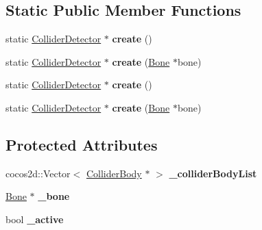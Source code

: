 \subsection*{Static Public Member Functions}
\begin{DoxyCompactItemize}
\item 
\mbox{\label{classcocostudio_1_1ColliderDetector_a4f50614bb946690fc646c7e4a01f9598}} 
static \hyperlink{classcocostudio_1_1ColliderDetector}{Collider\+Detector} $\ast$ {\bfseries create} ()
\item 
\mbox{\label{classcocostudio_1_1ColliderDetector_a4b89505c1329dca09ca7022883796aeb}} 
static \hyperlink{classcocostudio_1_1ColliderDetector}{Collider\+Detector} $\ast$ {\bfseries create} (\hyperlink{classcocostudio_1_1Bone}{Bone} $\ast$bone)
\item 
\mbox{\label{classcocostudio_1_1ColliderDetector_a0b5566d5f4f0ed86a51f2a80c66f1a51}} 
static \hyperlink{classcocostudio_1_1ColliderDetector}{Collider\+Detector} $\ast$ {\bfseries create} ()
\item 
\mbox{\label{classcocostudio_1_1ColliderDetector_ae360137596dc687be08be74cd0ca15f0}} 
static \hyperlink{classcocostudio_1_1ColliderDetector}{Collider\+Detector} $\ast$ {\bfseries create} (\hyperlink{classcocostudio_1_1Bone}{Bone} $\ast$bone)
\end{DoxyCompactItemize}
\subsection*{Protected Attributes}
\begin{DoxyCompactItemize}
\item 
\mbox{\label{classcocostudio_1_1ColliderDetector_a824d98575aaa1c4ca253c849307562a3}} 
cocos2d\+::\+Vector$<$ \hyperlink{classcocostudio_1_1ColliderBody}{Collider\+Body} $\ast$ $>$ {\bfseries \+\_\+collider\+Body\+List}
\item 
\mbox{\label{classcocostudio_1_1ColliderDetector_a7849e9a0dc8d7b08dac717fecbc0b3b5}} 
\hyperlink{classcocostudio_1_1Bone}{Bone} $\ast$ {\bfseries \+\_\+bone}
\item 
\mbox{\label{classcocostudio_1_1ColliderDetector_ae02572dfcce4b49c88483f386d9e8e1e}} 
bool {\bfseries \+\_\+active}
\end{DoxyCompactItemize}


